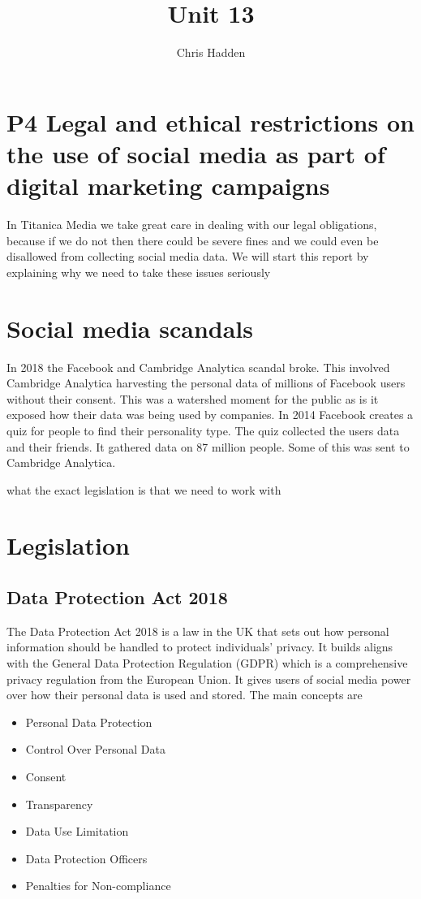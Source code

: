 \documentclass{article}
\begin{document}
\title{Unit 13}
\author{Chris Hadden}
\date{}
\maketitle

\section{P4 Legal and ethical restrictions on the use of social media as part of
digital marketing campaigns}

In Titanica Media we take great care in dealing with our legal obligations, because if we do not then there could be severe fines and we could even be disallowed from collecting social media data.
We will start this report by explaining why we need to take these issues seriously
\section{Social media scandals}
In 2018 the Facebook and Cambridge Analytica scandal broke. This involved Cambridge Analytica harvesting the personal data of millions of Facebook users without their consent\cite{cac}. This was a watershed moment for the public as is it exposed how their data was being used by companies.
In 2014 Facebook creates a quiz for people to find their personality type. The quiz collected the users data and their friends. It gathered data on 87 million people. Some of this was sent to Cambridge Analytica. 

what the exact legislation is that we need to work with

\section{Legislation}
\subsection{Data Protection Act 2018}
The Data Protection Act 2018 is a law in the UK that sets out how personal information should be handled to protect individuals' privacy. 
It builds aligns with the General Data Protection Regulation (GDPR) which is a comprehensive privacy regulation from the European Union.
It gives users of social media power over how their personal data is used and stored. 
The main concepts are
\begin{itemize}
    \item Personal Data Protection
    \item Control Over Personal Data
    \item Consent
    \item Transparency
    \item Data Use Limitation
    \item Data Protection Officers
    \item Penalties for Non-compliance
\end{itemize}
\end{document}
